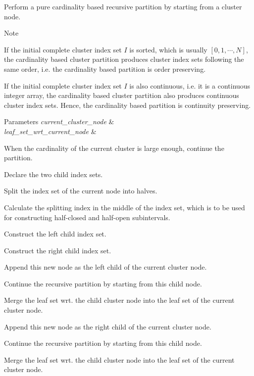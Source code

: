 Perform a pure cardinality based recursive partition by starting from a cluster node.


\begin{DoxyDescription}
\item[Note ]
\begin{DoxyEnumerate}
\item If the initial complete cluster index set $I$ is sorted, which is usually $[0, 1, \cdots, N]$, the cardinality based cluster partition produces cluster index sets following the same order, i.\+e. the cardinality based partition is order preserving.
\item If the initial complete cluster index set $I$ is also continuous, i.\+e. it is a continuous integer array, the cardinality based cluster partition also produces continuous cluster index sets. Hence, the cardinality based partition is continuity preserving.  
\end{DoxyEnumerate}
\end{DoxyDescription}


\begin{DoxyParams}{Parameters}
{\em current\+\_\+cluster\+\_\+node} & \\
\hline
{\em leaf\+\_\+set\+\_\+wrt\+\_\+current\+\_\+node} & \\
\hline
\end{DoxyParams}
When the cardinality of the current cluster is large enough, continue the partition.

Declare the two child index sets.

Split the index set of the current node into halves.

Calculate the splitting index in the middle of the index set, which is to be used for constructing half-\/closed and half-\/open subintervals.

Construct the left child index set.

Construct the right child index set.

Append this new node as the left child of the current cluster node.

Continue the recursive partition by starting from this child node.

Merge the leaf set wrt. the child cluster node into the leaf set of the current cluster node.

Append this new node as the right child of the current cluster node.

Continue the recursive partition by starting from this child node.

Merge the leaf set wrt. the child cluster node into the leaf set of the current cluster node.

